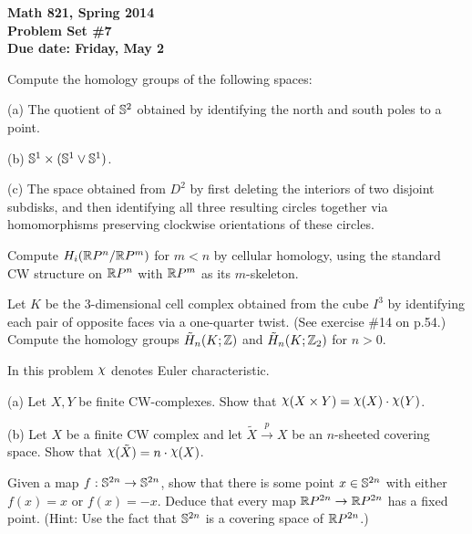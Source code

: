 
\usepackage{youngtab}

\thispagestyle{empty}
{\bf Math 821, Spring 2014\\
Problem Set \#7\\
Due date: Friday, May 2}
\vfill


\vfill{}  Compute the homology groups of the following spaces:

(a) The quotient of $\mathbb{S}^2$ obtained by identifying the north and south poles to a point.

(b) $\mathbb{S}^1\times(\mathbb{S}^1\vee \mathbb{S}^1)$.

(c) The space obtained from $D^2$ by first deleting the interiors of two disjoint subdisks, and then identifying all three resulting circles together via homomorphisms preserving clockwise orientations of these circles.

\vfill\prob [Hatcher p.157 \#19] Compute $H_i(\mathbb{R} P^n/\mathbb{R} P^m)$ for $m<n$ by cellular homology, using the standard CW structure on $\mathbb{R} P^n$ with $\mathbb{R} P^m$ as its $m$-skeleton.

\vfill\prob [Hatcher p.156 \#11] Let $K$ be the 3-dimensional cell complex obtained from the cube $I^3$ by identifying each pair of opposite faces via a one-quarter twist.  (See exercise \#14 on p.54.)  Compute the homology groups $\tilde H_n(K;\mathbb{Z})$ and $\tilde H_n(K;\mathbb{Z}_2)$ for $n>0$.

\vfill\prob[Hatcher p.157 \#20,22]  In this problem $\rchi$ denotes Euler characteristic.

(a) Let $X,Y$ be finite CW-complexes.  Show that $\rchi(X\x Y)=\rchi(X)\cdot\rchi(Y)$.

(b) Let $X$ be a finite CW complex and let $\tilde X\xrightarrow{~p~} X$ be an $n$-sheeted covering space.  Show that
$\rchi(\tilde X)=n\cdot\rchi(X)$.

\vfill{} Given a map $f:\mathbb{S}^{2n}\to \mathbb{S}^{2n}$, show that there is some point $x\in \mathbb{S}^{2n}$
with either $f(x)=x$ or $f(x)=-x$.  Deduce that every map $\mathbb{R} P^{2n}\to\mathbb{R} P^{2n}$ has a fixed point.  (Hint: Use the fact that $\mathbb{S}^{2n}$ is a covering space of $\mathbb{R} P^{2n}$.)

